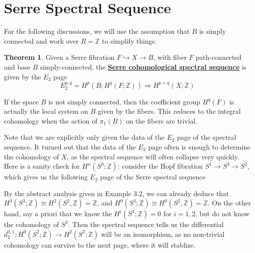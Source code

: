 \documentclass{article}
\theoremstyle{definition}
\newtheorem{theorem}{Theorem}[section]
\theoremstyle{definition}
\theoremstyle{definition}
\theoremstyle{definition}
\theoremstyle{definition}
\theoremstyle{definition}
\begin{document}
\section{Serre Spectral Sequence}
For the following discussions, we will use the assumption that $B$ is simply connected and work over $R=\mathbb{Z}$ to simplify things. 


\begin{tcolorbox}[colback=red!5!white,colframe=red!30!white]
\begin{theorem}
	Given a Serre fibration $F\hookrightarrow X\to B$, with fiber $F$ path-connected and base $B$ simply-connected, the \underline{\textbf{Serre cohomological spectral sequence}} is given by the $E_2$ page 
	\[
	E_2^{p,q}=H ^{p}(B; H ^{q}(F; \mathbb{Z})) \Longrightarrow H ^{p+q}(X; \mathbb{Z})
	\]
\end{theorem}
\end{tcolorbox}

If the space $B$ is not simply connected, then the coefficient group $H ^{q}(F)$ is actually the local system on $B$ given by the fibers. This reduces to the integral cohomology when the action of $\pi_1(B)$ on the fibers are trivial.

Note that we are explicitly only given the data of the $E_2$ page of the spectral sequence. It turned out that the data of the $E_2$ page often is enough to determine the cohomology of $X$, as the spectral sequence will often collapse very quickly. Here is a sanity check for $H^n(S^3; \mathbb{Z})$: consider the Hopf fibration $S^1\to S^3\to S^2$, which gives us the following $E_2$ page of the Serre spectral sequence


By the abstract analysis given in Example $3.2$, we can already deduce that $H^3(S^3;\mathbb{Z})\cong H^2(S^2, \mathbb{Z})=\mathbb{Z}$, and  $H^0(S^3;\mathbb{Z})\cong H^0(S^2, \mathbb{Z})=\mathbb{Z}$. On the other hand, say a priori that we know the $H^i(S^3;\mathbb{Z})=0$ for $i=1,2$, but do not know the cohomology of $S^2$. Then the spectral sequence tells us the differential $d_2^{0,1}: H^0(S^2;\mathbb{Z})\to H^2(S^2;\mathbb{Z})$ will be an isomorphism, as no non-trivial cohomology can survive to the next page, where it will stablize.
\end{document}
